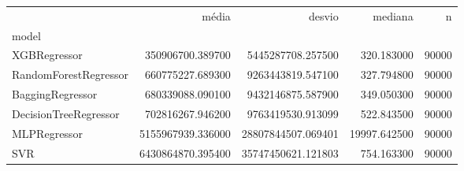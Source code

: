 \begin{tabular}{lrrrr}
\toprule
 & média & desvio & mediana & n \\
model &  &  &  &  \\
\midrule
XGBRegressor & 350906700.389700 & 5445287708.257500 & 320.183000 & 90000 \\
RandomForestRegressor & 660775227.689300 & 9263443819.547100 & 327.794800 & 90000 \\
BaggingRegressor & 680339088.090100 & 9432146875.587900 & 349.050300 & 90000 \\
DecisionTreeRegressor & 702816267.946200 & 9763419530.913099 & 522.843500 & 90000 \\
MLPRegressor & 5155967939.336000 & 28807844507.069401 & 19997.642500 & 90000 \\
SVR & 6430864870.395400 & 35747450621.121803 & 754.163300 & 90000 \\
\bottomrule
\end{tabular}
